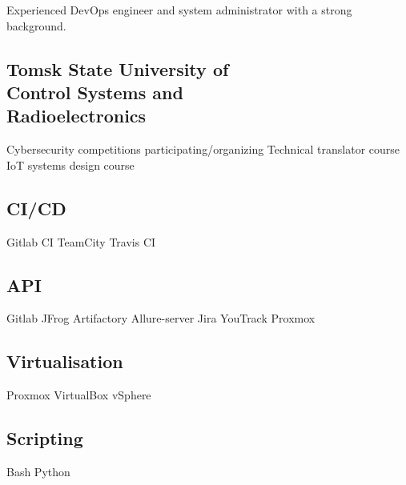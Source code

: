 \documentclass[a4paper]{MagicalCV}
\begin{document}


\begin{minipage}[t]{0.34\textwidth} 


Experienced DevOps engineer and system administrator with a strong background.
\sectionsep




\sectionsep


\subsection{Tomsk State University of \\ Control Systems and \\ Radioelectronics}
\vspace{\topsep} %
Cybersecurity competitions participating/organizing \textbullet{} Technical translator course \textbullet{} IoT systems design course
\sectionsep


\subsection{CI/CD}
Gitlab CI \textbullet{} 
TeamCity \textbullet{} 
Travis CI 
\subsection{API}
Gitlab \textbullet{} 
JFrog Artifactory \textbullet{} 
Allure-server \textbullet{}
Jira \textbullet{} 
YouTrack \textbullet{} 
Proxmox
\subsection{Virtualisation}
Proxmox \textbullet{} 
VirtualBox \textbullet{} 
vSphere 
\subsection{Scripting}
Bash \textbullet{} 
Python

\end{minipage}
\end{document}
